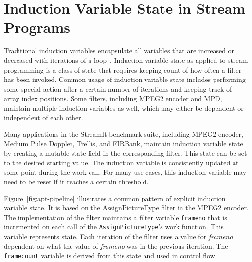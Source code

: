 \section{Induction Variable State in Stream Programs}
\label{sec:inductionstate}

  




Traditional induction variables encapsulate all variables that are
increased or decreased with iterations of a loop~\cite{Aho:1986}.
Induction variable state as applied to stream programming is a class
of state that requires keeping count of how often a filter has been
invoked.  Common usage of induction variable state includes performing
some special action after a certain number of iterations and keeping
track of array index positions.  Some filters, including MPEG2 encoder
and MPD, maintain multiple induction variables as well, which may
either be dependent or independent of each other.

Many applications in the StreamIt benchmark suite, including MPEG2 encoder,
Medium Pulse Doppler, Trellis, and FIRBank, maintain induction variable state 
by creating a mutable state field in the corresponding filter.  This
state can be set to the desired starting value.  The induction
variable is consistently updated at some point during the work call.
For many use cases, this induction variable may need to be reset if it
reaches a certain threshold. 

Figure~\ref{fig:apt-pipeline} illustrates a common pattern of explicit
induction variable state.  It is based on the AssignPictureType filter in 
the MPEG2 encoder. The implementation of the filter maintains
a filter variable {\tt frameno} that is incremented on each call of
the {\tt AssignPictureType}'s work function.  This variable
represents state.  Each iteration of the 
filter uses a value for {\it frameno} dependent on what the value of
{\it frameno} was in the previous iteration.  The {\tt framecount} variable is derived
from this state and used in control flow.

